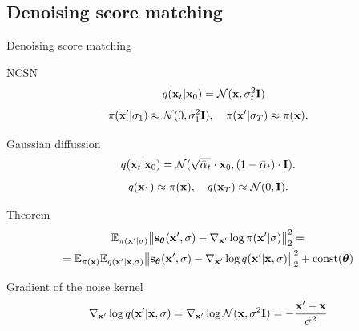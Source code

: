 \subsection{Denoising score matching}
\begin{frame}{Denoising score matching}
	\begin{block}{NCSN} 
		\[
			\quad q(\mathbf{x}_t | \mathbf{x}_0) = \mathcal{N}(\mathbf{x}, \sigma_t^2 \mathbf{I})
		\]
		\[
			\pi(\mathbf{x}' | \sigma_1) \approx \mathcal{N}(0, \sigma_1^2 \mathbf{I}), \quad \pi(\mathbf{x}' | \sigma_T) \approx \pi(\mathbf{x}).
		\]
	\end{block}
	\begin{block}{Gaussian diffussion}
	\[
		q(\mathbf{x}_t | \mathbf{x}_0) = \mathcal{N}(\sqrt{\bar{\alpha}_t} \cdot \mathbf{x}_0, (1 - \bar{\alpha}_t) \cdot \mathbf{I}).
	\]
	\[
		q(\mathbf{x}_1) \approx \pi(\mathbf{x}), \quad q(\mathbf{x}_T) \approx \mathcal{N}(0, \mathbf{I}).
	\]
	\end{block}
	\vspace{-0.4cm} 
	\begin{block}{Theorem}
	\vspace{-0.5cm}
	\begin{multline*}
		\mathbb{E}_{\pi(\mathbf{x}' | \sigma)}\bigl\| \mathbf{s}_{\boldsymbol{\theta}}(\mathbf{x}', \sigma) - \nabla_{\mathbf{x}'} \log \pi(\mathbf{x}' | \sigma) \bigr\|^2_2 = \\
		= \mathbb{E}_{\pi(\mathbf{x})} \mathbb{E}_{q(\mathbf{x}' | \mathbf{x}, \sigma)}\bigl\| \mathbf{s}_{\boldsymbol{\theta}}(\mathbf{x}', \sigma) - \nabla_{\mathbf{x}'} \log q(\mathbf{x}' | \mathbf{x}, \sigma) \bigr\|^2_2 + \text{const}(\boldsymbol{\theta})
	\end{multline*}
	\vspace{-0.5cm}
	\end{block}
	\begin{block}{Gradient of the noise kernel}
		\vspace{-0.4cm}
		\[
			\nabla_{\mathbf{x}'} \log q(\mathbf{x}' | \mathbf{x}, \sigma) = \nabla_{\mathbf{x}'} \log \mathcal{N}(\mathbf{x}, \sigma^2 \mathbf{I}) = - \frac{\mathbf{x}' - \mathbf{x}}{\sigma^2}
		\]
		\vspace{-0.5cm}
	\end{block}
\end{frame}
